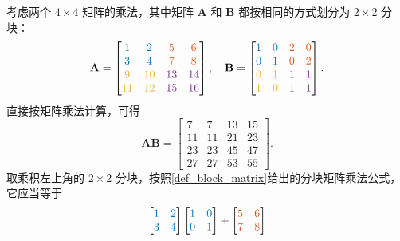 \begin{example}
    考虑两个 \(4 \times 4\) 矩阵的乘法，其中矩阵 \(\mathbf{A}\) 和 \(\mathbf{B}\) 都按相同的方式划分为 \(2 \times 2\) 分块：
    \[
        \mathbf{A}=
        \begin{bmatrix}
            \textcolor{c1}{1}  & \textcolor{c1}{2}  & \textcolor{c2}{5}  & \textcolor{c2}{6}  \\
            \textcolor{c1}{3}  & \textcolor{c1}{4}  & \textcolor{c2}{7}  & \textcolor{c2}{8}  \\
            \textcolor{c3}{9}  & \textcolor{c3}{10} & \textcolor{c4}{13} & \textcolor{c4}{14} \\
            \textcolor{c3}{11} & \textcolor{c3}{12} & \textcolor{c4}{15} & \textcolor{c4}{16}
        \end{bmatrix},
        \quad
        \mathbf{B}=
        \begin{bmatrix}
            \textcolor{c1}{1} & \textcolor{c1}{0} & \textcolor{c2}{2} & \textcolor{c2}{0} \\
            \textcolor{c1}{0} & \textcolor{c1}{1} & \textcolor{c2}{0} & \textcolor{c2}{2} \\
            \textcolor{c3}{0} & \textcolor{c3}{1} & \textcolor{c4}{1} & \textcolor{c4}{1} \\
            \textcolor{c3}{1} & \textcolor{c3}{0} & \textcolor{c4}{1} & \textcolor{c4}{1}
        \end{bmatrix}.
    \]
    直接按矩阵乘法计算，可得
    \[
        \mathbf{A}\mathbf{B}=
        \begin{bmatrix}
            7  & 7  & 13 & 15 \\
            11 & 11 & 21 & 23 \\
            23 & 23 & 45 & 47 \\
            27 & 27 & 53 & 55
        \end{bmatrix}.
    \]
    取乘积左上角的 \(2\times 2\) 分块，按照\cref{def_block_matrix}给出的分块矩阵乘法公式，它应当等于
    \[
        \begin{bmatrix}\textcolor{c1}{1} & \textcolor{c1}{2} \\ \textcolor{c1}{3} & \textcolor{c1}{4}\end{bmatrix}
        \begin{bmatrix}\textcolor{c1}{1} & \textcolor{c1}{0} \\ \textcolor{c1}{0} & \textcolor{c1}{1}\end{bmatrix}
        +
        \begin{bmatrix}\textcolor{c2}{5} & \textcolor{c2}{6} \\ \textcolor{c2}{7} & \textcolor{c2}{8}\end{bmatrix}
\]
\end{example}
